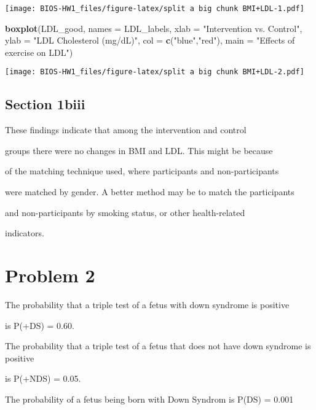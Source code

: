 \documentclass[]{article}
\newenvironment{Shaded}{\begin{snugshade}}{\end{snugshade}}
\newcommand{\DataTypeTok}[1]{\textcolor[rgb]{0.13,0.29,0.53}{#1}}
\newcommand{\KeywordTok}[1]{\textcolor[rgb]{0.13,0.29,0.53}{\textbf{#1}}}
\newcommand{\NormalTok}[1]{#1}
\newcommand{\StringTok}[1]{\textcolor[rgb]{0.31,0.60,0.02}{#1}}
\begin{document}
\texttt{[image: BIOS-HW1\_files/figure-latex/split a big chunk BMI+LDL-1.pdf]}

\begin{Shaded}
\begin{Highlighting}[]
\KeywordTok{boxplot}\NormalTok{(LDL_good,}
        \DataTypeTok{names =}\NormalTok{ LDL_labels,}
        \DataTypeTok{xlab =} \StringTok{"Intervention vs. Control"}\NormalTok{,}
        \DataTypeTok{ylab =} \StringTok{"LDL Cholesterol (mg/dL)"}\NormalTok{, }
        \DataTypeTok{col =} \KeywordTok{c}\NormalTok{(}\StringTok{"blue"}\NormalTok{,}\StringTok{"red"}\NormalTok{), }
        \DataTypeTok{main =} \StringTok{"Effects of exercise on LDL"}\NormalTok{)}
\end{Highlighting}
\end{Shaded}

\texttt{[image: BIOS-HW1\_files/figure-latex/split a big chunk BMI+LDL-2.pdf]}

\hypertarget{section-1biii}{%
\subsection{Section 1biii}\label{section-1biii}}

These findings indicate that among the intervention and control

groups there were no changes in BMI and LDL. This might be because

of the matching technique used, where participants and non-participants

were matched by gender. A better method may be to match the participants

and non-participants by smoking status, or other health-related

indicators.

\hypertarget{problem-2}{%
\section{Problem 2}\label{problem-2}}

The probability that a triple test of a fetus with down syndrome is
positive

is P(+\textbar{}DS) = 0.60.

The probability that a triple test of a fetus that does not have down
syndrome is positive

is P(+\textbar{}NDS) = 0.05.

The probability of a fetus being born with Down Syndrom is P(DS) = 0.001
\end{document}

